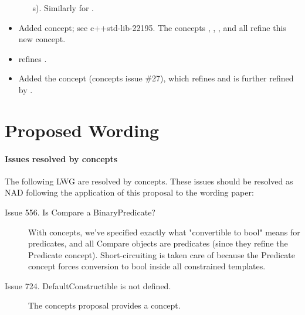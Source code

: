 \documentclass[american,twoside]{book}
\begin{document}
\begin{titlepage}
\begin{itemize}
\begin{itemize}
      s). Similarly for
      .
    \end{itemize}
  \item Added  concept; see c++std-lib-22195. The
    concepts , ,
    , and  all refine
    this new concept. 
  \item {} refines .
  \item Added the  concept (concepts issue
    \#27), which refines  and is further refined by
    .
  \end{itemize}

\end{titlepage}

\section*{Proposed Wording}
\paragraph*{Issues resolved by concepts}
The following LWG are resolved by concepts. These issues should be
resolved as NAD following the application of this proposal to the
wording paper:
\begin{description}
\item[Issue 556. Is Compare a BinaryPredicate?] With concepts, we've
  specified exactly what "convertible to bool" means for predicates,
  and all Compare objects are predicates (since they refine the
  Predicate concept). Short-circuiting is taken care of because the
  Predicate concept forces conversion to bool inside all constrained
  templates.
\item[Issue 724. DefaultConstructible is not defined.]
The concepts proposal provides a  concept.
\end{description}

\pagestyle{fancy}
\fancyhead[LE,RO]{\textbf{\rightmark}}
\fancyhead[RE]{\textbf{\leftmark\hspace{1em}\thepage}}
\fancyhead[LO]{\textbf{\thepage\hspace{1em}\leftmark}}

\end{document}
